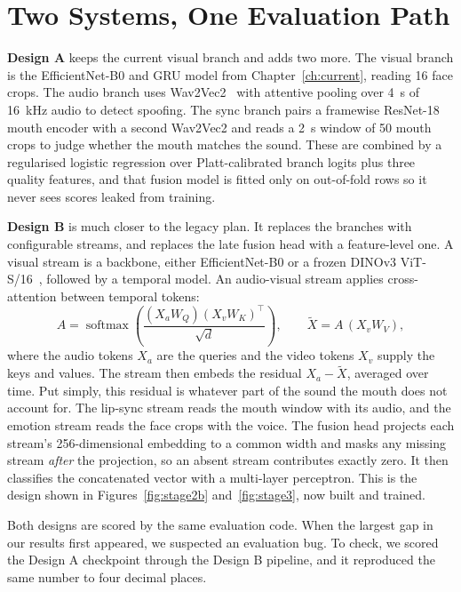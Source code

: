 \section{Two Systems, One Evaluation Path}

\textbf{Design A} keeps the current visual branch and adds two more. The
visual branch is the EfficientNet-B0 and GRU model from
Chapter~\ref{ch:current}, reading 16 face crops. The audio branch uses
Wav2Vec2~\cite{wav2vec2} with attentive pooling over 4~s of 16~kHz audio to
detect spoofing. The sync branch pairs a framewise ResNet-18 mouth encoder with
a second Wav2Vec2 and reads a 2~s window of 50 mouth crops to judge whether the
mouth matches the sound. These are combined by a regularised logistic
regression over Platt-calibrated branch logits plus three quality features, and
that fusion model is fitted only on out-of-fold rows so it never sees scores
leaked from training.

\textbf{Design B} is much closer to the legacy plan. It replaces the branches
with configurable streams, and replaces the late fusion head with a
feature-level one. A visual stream is a backbone, either EfficientNet-B0 or a
frozen DINOv3 ViT-S/16~\cite{dinov3}, followed by a temporal model. An
audio-visual stream applies cross-attention between temporal tokens:
\begin{equation}
A = \operatorname{softmax}\!\left(\frac{(X_a W_Q)(X_v W_K)^\top}{\sqrt{d}}\right),
\qquad \tilde{X} = A\,(X_v W_V),
\end{equation}
where the audio tokens $X_a$ are the queries and the video tokens $X_v$ supply
the keys and values. The stream then embeds the residual $X_a - \tilde{X}$,
averaged over time. Put simply, this residual is whatever part of the sound the
mouth does not account for. The lip-sync stream reads the mouth window with its
audio, and the emotion stream reads the face crops with the voice. The fusion
head projects each stream's 256-dimensional embedding to a common width and
masks any missing stream \emph{after} the projection, so an absent stream
contributes exactly zero. It then classifies the concatenated vector with a
multi-layer perceptron. This is the design shown in
Figures~\ref{fig:stage2b} and~\ref{fig:stage3}, now built and trained.

Both designs are scored by the same evaluation code. When the largest gap in
our results first appeared, we suspected an evaluation bug. To check, we
scored the Design A checkpoint through the Design B pipeline, and it reproduced
the same number to four decimal places.

